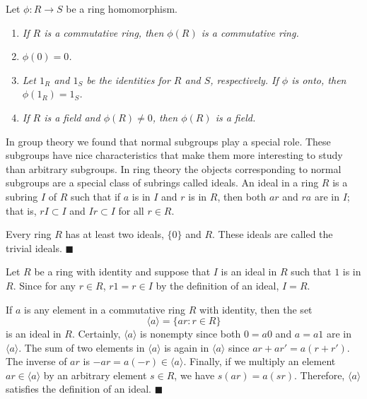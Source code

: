  
\begin{proposition}
Let $\phi : R \rightarrow S$ be a ring homomorphism.
\begin{enumerate}
 
\rm \item \it
If $R$ is a commutative ring, then $\phi(R)$ is a
commutative ring. 
 
\rm \item \it
$\phi( 0 ) = 0$. 
 
\rm \item \it
Let $1_R$ and $1_S$ be the identities for $R$ and $S$, respectively.
If $\phi$ is onto, then $\phi(1_R) = 1_S$.  
 
\rm \item \it
If $R$ is a field and $\phi(R) \neq 0$, then $\phi(R)$ is a field.
 
\end{enumerate}
\end{proposition}
 
 
In group theory we found that normal subgroups play a special role.
These subgroups have nice characteristics that make them more
interesting to study than arbitrary subgroups.  In ring theory the
objects corresponding to normal subgroups are a special class of
subrings called ideals. An {\bfi ideal\/}
in a ring $R$ is a subring $I$ of $R$ such that if $a$ is in $I$ and
$r$ is in $R$, then both $ar$ and $ra$ are in $I$; that is, $rI
\subset I$ and $Ir \subset I$ for all $r \in R$.  
 
 
\vspace{2ex}
 
 
Every ring $R$ has at least two ideals, $\{ 0 \}$ and $R$.  These
ideals are called the {\bfi trivial ideals}. 
\hspace{\fill} $\blacksquare$
 
 
\vspace{2ex}
 
 
Let $R$ be a ring with identity and suppose that $I$ is an ideal in
$R$ such that $1$ is in $R$. Since for any $r \in R$, $r1 = r \in 
I$ by the definition of an ideal, $I = R$.
 
 
\vspace{2ex}
 
 
If $a$ is any element in a commutative ring $R$ with identity, then
the set   
\[
\langle a \rangle = \{ ar : r \in R \}
\]
is an ideal in $R$. Certainly, $\langle a \rangle$ is nonempty since both
$0 = a0$ and $a = a1$ are in $\langle a \rangle$. The
sum of two elements in $\langle a \rangle$ is again in $\langle a
\rangle$ since $ar + ar' =  a(r + r')$. The inverse of $ar$ is $-ar =
a (-r) \in \langle a \rangle$.  Finally, if we multiply an element $ar
\in \langle a \rangle$ by an arbitrary element $s \in R$, we have
$s(ar) = a(sr)$.  Therefore, $\langle a \rangle$ satisfies the
definition of an ideal. 
\hspace{\fill} $\blacksquare$
 
